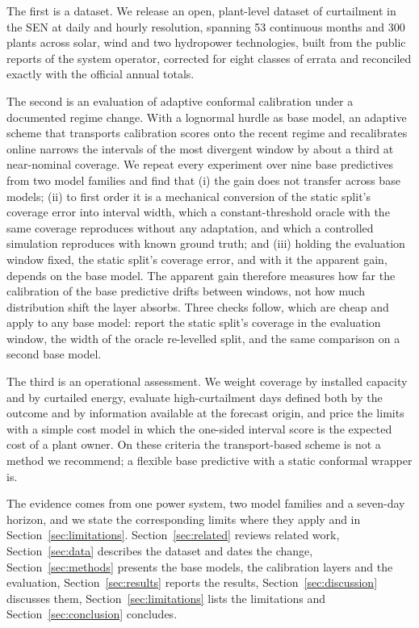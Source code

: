 The first is a dataset. We release an open, plant-level dataset of curtailment in the SEN at daily and hourly resolution, spanning 53 continuous months and 300 plants across solar, wind and two hydropower technologies, built from the public reports of the system operator, corrected for eight classes of errata and reconciled exactly with the official annual totals.

The second is an evaluation of adaptive conformal calibration under a documented regime change. With a lognormal hurdle as base model, an adaptive scheme that transports calibration scores onto the recent regime and recalibrates online narrows the intervals of the most divergent window by about a third at near-nominal coverage. We repeat every experiment over nine base predictives from two model families and find that (i) the gain does not transfer across base models; (ii) to first order it is a mechanical conversion of the static split's coverage error into interval width, which a constant-threshold oracle with the same coverage reproduces without any adaptation, and which a controlled simulation reproduces with known ground truth; and (iii) holding the evaluation window fixed, the static split's coverage error, and with it the apparent gain, depends on the base model. The apparent gain therefore measures how far the calibration of the base predictive drifts between windows, not how much distribution shift the layer absorbs. Three checks follow, which are cheap and apply to any base model: report the static split's coverage in the evaluation window, the width of the oracle re-levelled split, and the same comparison on a second base model.

The third is an operational assessment. We weight coverage by installed capacity and by curtailed energy, evaluate high-curtailment days defined both by the outcome and by information available at the forecast origin, and price the limits with a simple cost model in which the one-sided interval score is the expected cost of a plant owner. On these criteria the transport-based scheme is not a method we recommend; a flexible base predictive with a static conformal wrapper is.

The evidence comes from one power system, two model families and a seven-day horizon, and we state the corresponding limits where they apply and in Section~\ref{sec:limitations}. Section~\ref{sec:related} reviews related work, Section~\ref{sec:data} describes the dataset and dates the change, Section~\ref{sec:methods} presents the base models, the calibration layers and the evaluation, Section~\ref{sec:results} reports the results, Section~\ref{sec:discussion} discusses them, Section~\ref{sec:limitations} lists the limitations and Section~\ref{sec:conclusion} concludes.

